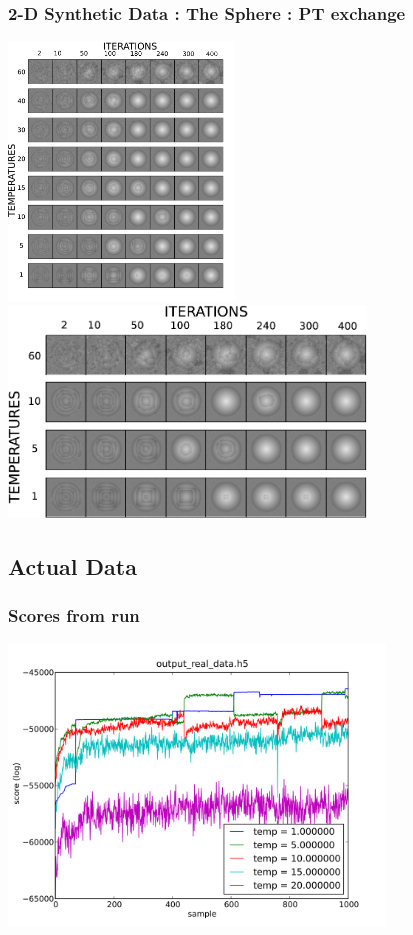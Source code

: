 \documentclass[compress]{beamer}
\begin{document}
\begin{frame}
  \frametitle{2-D Synthetic Data : The Sphere : PT exchange}
   {
    \includegraphics[width=6cm]{sphere_replica}
  }
   {
    \includegraphics[width=9.5cm]{sphere_replica_zoom}
  }
\end{frame}

\subsection{Actual Data}

\begin{frame}
  \frametitle{Scores from run}
  \includegraphics[width=10cm]{data_scores}
\end{frame}
\end{document}
